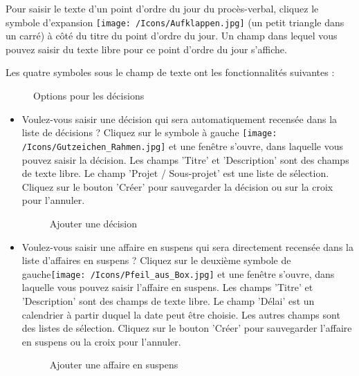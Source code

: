 Pour saisir le texte d'un point d'ordre du jour du procès-verbal, cliquez le symbole d'expansion \texttt{[image: /Icons/Aufklappen.jpg]}  (un petit triangle dans un carré) à côté du titre du point d'ordre du jour. Un champ dans lequel vous pouvez saisir du texte libre pour ce point d'ordre du jour  s'affiche.

\vspace{\baselineskip}

Les quatre symboles sous le champ de texte ont les fonctionnalités suivantes :

\begin{figure}[H]
\caption{Options pour les décisions}
\end{figure}

\begin{itemize}
\item
Voulez-vous saisir une décision qui sera automatiquement recensée dans la liste de décisions ? Cliquez sur le symbole à gauche \texttt{[image: /Icons/Gutzeichen\_Rahmen.jpg]}  et une fenêtre s'ouvre, dans laquelle vous pouvez saisir la décision. Les champs 'Titre'  et 'Description'  sont des champs de texte libre. Le champ 'Projet / Sous-projet'  est une liste de sélection. Cliquez sur le bouton 'Créer'  pour sauvegarder la décision ou sur la croix  pour l'annuler.

\begin{figure}[H]
\caption{Ajouter une décision}
\end{figure}

\end{itemize}

\begin{itemize}
\item
Voulez-vous saisir une affaire en suspens qui sera directement recensée dans la liste d'affaires en suspens ? Cliquez sur le deuxième symbole de gauche\texttt{[image: /Icons/Pfeil\_aus\_Box.jpg]}  et une fenêtre s'ouvre, dans laquelle vous pouvez saisir l'affaire en suspens. Les champs 'Titre'  et 'Description'  sont des champs de texte libre. Le champ 'Délai'  est un calendrier à partir duquel la date peut être choisie. Les autres champs  sont des listes de sélection. Cliquez sur le bouton 'Créer'  pour sauvegarder l'affaire en suspens ou la croix  pour l'annuler.

\begin{figure}[H]
\caption{Ajouter une affaire en suspens}
\end{figure}

\end{itemize}

